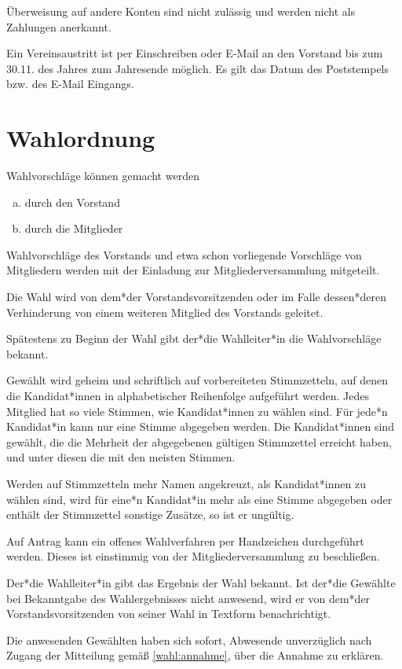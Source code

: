 \begin{beitrag}
  Überweisung auf andere Konten sind nicht zulässig und werden nicht als Zahlungen anerkannt.

  Ein Vereinsaustritt ist per Einschreiben oder E-Mail an den Vorstand bis zum 30.11. des Jahres zum Jahresende möglich. Es gilt das Datum des Poststempels bzw. des E-Mail Eingangs.

\end{beitrag}

\section{Wahlordnung}
\begin{wahl}

  Wahlvorschläge können gemacht werden
  \begin{enumerate}[(a)]
    \item durch den Vorstand
    \item durch die Mitglieder
  \end{enumerate}

  Wahlvorschläge des Vorstands und etwa schon vorliegende Vorschläge von Mitgliedern werden mit der Einladung zur Mitgliederversammlung mitgeteilt.

  Die Wahl wird von dem*der Vorstandsvorsitzenden oder im Falle dessen*deren Verhinderung von einem weiteren Mitglied des Vorstands geleitet.

  Spätestens zu Beginn der Wahl gibt der*die Wahlleiter*in die Wahlvorschläge bekannt.

  Gewählt wird geheim und schriftlich auf vorbereiteten Stimmzetteln, auf denen die Kandidat*innen in alphabetischer Reihenfolge aufgeführt werden. Jedes Mitglied hat so viele Stimmen, wie Kandidat*innen zu wählen sind. Für jede*n Kandidat*in kann nur eine Stimme abgegeben werden. Die Kandidat*innen sind gewählt, die die Mehrheit der abgegebenen gültigen Stimmzettel erreicht haben, und unter diesen die mit den meisten Stimmen.

  Werden auf Stimmzetteln mehr Namen angekreuzt, als Kandidat*innen zu wählen sind, wird für eine*n Kandidat*in mehr als eine Stimme abgegeben oder enthält der Stimmzettel sonstige Zusätze, so ist er ungültig.

  Auf Antrag kann ein offenes Wahlverfahren per Handzeichen durchgeführt werden. Dieses ist einstimmig von der Mitgliederversammlung zu beschlie\ss{}en.

  Der*die Wahlleiter*in gibt das Ergebnis der Wahl bekannt. Ist der*die Gewählte bei Bekanntgabe des Wahlergebnisses nicht anwesend, wird er von dem*der Vorstandsvorsitzenden von seiner Wahl in Textform benachrichtigt.
  \label{wahl:annahme}

  Die anwesenden Gewählten haben sich sofort, Abwesende unverzüglich nach Zugang der Mitteilung gemä\ss{} \ref{wahl:annahme}, über die Annahme zu erklären.

\end{wahl}

